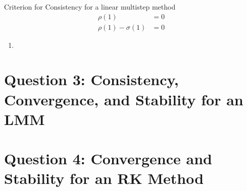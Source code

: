 \documentclass{article}
\begin{document}
Criterion for Consistency for a linear multistep method
\begin{align}
\rho(1) &=0 \\
\rho(1) - \sigma(1) &=0
\end{align}

\begin{enumerate}[label=\alph*)]

  \item       

\end{enumerate}
\section*{Question 3: Consistency, Convergence, and Stability for an LMM}

\section*{Question 4: Convergence and Stability for an RK Method}
\end{document}
